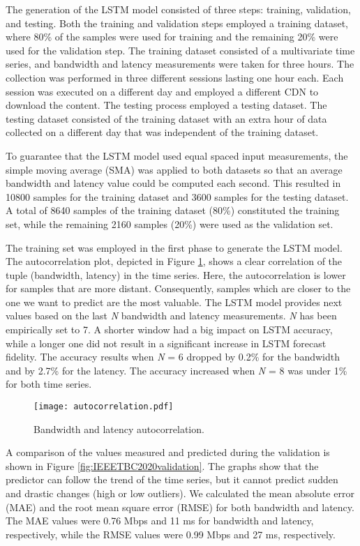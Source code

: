 The generation of the LSTM model consisted of three steps: training, validation, and testing. Both the training and validation steps employed a training dataset, where 80\% of the samples were used for training and the remaining 20\% were used for the validation step. The training dataset consisted of a multivariate time series, and bandwidth and latency measurements were taken for three hours. The collection was performed in three different sessions lasting one hour each. Each session was executed on a different day and employed a different CDN to download the content. The testing process employed a testing dataset. The testing dataset consisted of the training dataset with an extra hour of data collected on a different day that was independent of the training dataset.

To guarantee that the LSTM model used equal spaced input measurements, the simple moving average (SMA) was applied to both datasets so that an average bandwidth and latency value could be computed each second. This resulted in 10800 samples for the training dataset and 3600 samples for the testing dataset. A total of 8640 samples of the training dataset (80\%) constituted the training set, while the remaining 2160 samples (20\%) were used as the validation set.

The training set was employed in the first phase to generate the LSTM model. The autocorrelation plot, depicted in Figure \ref{fig:IEEETBC2020autocorrelation}, shows a clear correlation of the tuple (bandwidth, latency) in the time series. Here, the autocorrelation is lower for samples that are more distant. Consequently, samples which are closer to the one we want to predict are the most valuable. The LSTM model provides next values based on the last \textit{N} bandwidth and latency measurements. \textit{N} has been empirically set to 7. A shorter window had a big impact on LSTM accuracy, while a longer one did not result in a significant increase in LSTM forecast fidelity. The accuracy results when \textit{N} = 6 dropped by 0.2\% for the bandwidth and by 2.7\% for the latency. The accuracy increased when \textit{N} = 8 was under 1\% for both time series.

\begin{figure}[htp]
	\centering
	\texttt{[image: autocorrelation.pdf]}
	\caption{Bandwidth and latency autocorrelation.}
	\label{fig:IEEETBC2020autocorrelation}
\end{figure}

A comparison of the values measured and predicted during the validation is shown in Figure \ref{fig:IEEETBC2020validation}. The graphs show that the predictor can follow the trend of the time series, but it cannot predict sudden and drastic changes (high or low outliers). We calculated the mean absolute error (MAE) and the root mean square error (RMSE) for both bandwidth and latency. The MAE values were 0.76 Mbps and 11 ms for bandwidth and latency, respectively, while the RMSE values were 0.99 Mbps and 27 ms, respectively.

